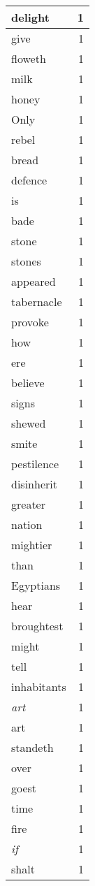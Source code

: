 \begin{center}
\begin{longtable}{l|r}
delight & 1 \\ \hline
give & 1 \\ \hline
floweth & 1 \\ \hline
milk & 1 \\ \hline
honey & 1 \\ \hline
Only & 1 \\ \hline
rebel & 1 \\ \hline
bread & 1 \\ \hline
defence & 1 \\ \hline
is & 1 \\ \hline
bade & 1 \\ \hline
stone & 1 \\ \hline
stones & 1 \\ \hline
appeared & 1 \\ \hline
tabernacle & 1 \\ \hline
provoke & 1 \\ \hline
how & 1 \\ \hline
ere & 1 \\ \hline
believe & 1 \\ \hline
signs & 1 \\ \hline
shewed & 1 \\ \hline
smite & 1 \\ \hline
pestilence & 1 \\ \hline
disinherit & 1 \\ \hline
greater & 1 \\ \hline
nation & 1 \\ \hline
mightier & 1 \\ \hline
than & 1 \\ \hline
Egyptians & 1 \\ \hline
hear & 1 \\ \hline
broughtest & 1 \\ \hline
might & 1 \\ \hline
tell & 1 \\ \hline
inhabitants & 1 \\ \hline
\emph{art} & 1 \\ \hline
art & 1 \\ \hline
standeth & 1 \\ \hline
over & 1 \\ \hline
goest & 1 \\ \hline
time & 1 \\ \hline
fire & 1 \\ \hline
\emph{if} & 1 \\ \hline
shalt & 1 \\ \hline

\end{longtable}
\end{center}

